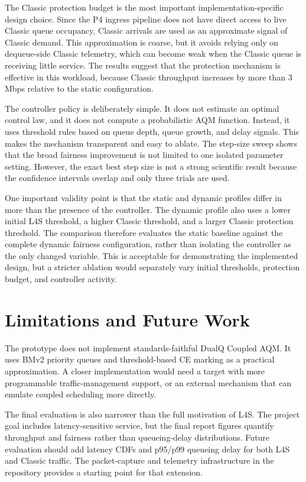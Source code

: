 \documentclass[10pt]{article}
\begin{document}
The Classic protection budget is the most important implementation-specific design choice. Since the P4 ingress pipeline does not have direct access to live Classic queue occupancy, Classic arrivals are used as an approximate signal of Classic demand. This approximation is coarse, but it avoids relying only on dequeue-side Classic telemetry, which can become weak when the Classic queue is receiving little service. The results suggest that the protection mechanism is effective in this workload, because Classic throughput increases by more than 3 Mbps relative to the static configuration.

The controller policy is deliberately simple. It does not estimate an optimal control law, and it does not compute a probabilistic AQM function. Instead, it uses threshold rules based on queue depth, queue growth, and delay signals. This makes the mechanism transparent and easy to ablate. The step-size sweep shows that the broad fairness improvement is not limited to one isolated parameter setting. However, the exact best step size is not a strong scientific result because the confidence intervals overlap and only three trials are used.

One important validity point is that the static and dynamic profiles differ in more than the presence of the controller. The dynamic profile also uses a lower initial L4S threshold, a higher Classic threshold, and a larger Classic protection threshold. The comparison therefore evaluates the static baseline against the complete dynamic fairness configuration, rather than isolating the controller as the only changed variable. This is acceptable for demonstrating the implemented design, but a stricter ablation would separately vary initial thresholds, protection budget, and controller activity.

\section{Limitations and Future Work}

The prototype does not implement standards-faithful DualQ Coupled AQM. It uses BMv2 priority queues and threshold-based CE marking as a practical approximation. A closer implementation would need a target with more programmable traffic-management support, or an external mechanism that can emulate coupled scheduling more directly.

The final evaluation is also narrower than the full motivation of L4S. The project goal includes latency-sensitive service, but the final report figures quantify throughput and fairness rather than queueing-delay distributions. Future evaluation should add latency CDFs and p95/p99 queueing delay for both L4S and Classic traffic. The packet-capture and telemetry infrastructure in the repository provides a starting point for that extension.
\end{document}

